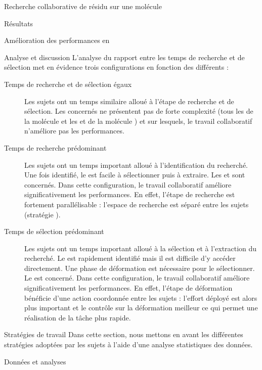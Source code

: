\documentclass[myfrancais,ngerman,english,french]{mythesis}
\begin{document}
\begin{mychapter}{Recherche collaborative de résidu sur une molécule}
\begin{mysection}{Résultats}
\begin{mysubsection}{Amélioration des performances en }
\begin{mysubsubsection}{Analyse et discussion}
					L'analyse du rapport entre les temps de recherche et de sélection met en évidence trois configurations en fonction des différents  :
					\begin{description}
						\item[Temps de recherche et de sélection égaux]
							Les sujets ont un temps similaire alloué à l'étape de recherche et de sélection.
							Les  concernés ne présentent pas de forte complexité (tous les  de la molécule \myTRPCAGE et les   et  de la molécule \myPrion) et sur lesquels, le travail collaboratif n'améliore pas les performances.
						\item[Temps de recherche prédominant]
							Les sujets ont un temps important alloué à l'identification du  recherché.
							Une fois identifié, le  est facile à sélectionner puis à extraire.
							Les   et  sont concernés.
							Dans cette configuration, le travail collaboratif améliore significativement les performances.
							En effet, l'étape de recherche est fortement parallélisable : l'espace de recherche est séparé entre les sujets (stratégie ).
						\item[Temps de sélection prédominant]
							Les sujets ont un temps important alloué à la sélection et à l'extraction du  recherché.
							Le  est rapidement identifié mais il est difficile d'y accéder directement.
							Une phase de déformation est nécessaire pour le sélectionner.
							Le   est concerné.
							Dans cette configuration, le travail collaboratif améliore significativement les performances.
							En effet, l'étape de déformation bénéficie d'une action coordonnée entre les sujets : l'effort déployé est alors plus important et le contrôle sur la déformation meilleur ce qui permet une réalisation de la tâche plus rapide.
					\end{description}
				\end{mysubsubsection}
			\end{mysubsection}
			\begin{mysubsection}{Stratégies de travail}
				Dans cette section, nous mettons en avant les différentes stratégies adoptées par les sujets à l'aide d'une analyse statistiques des données.
				\begin{mysubsubsection}{Données et analyses}

\end{mysubsubsection}
\end{mysubsection}
\end{mysection}
\end{mychapter}
\end{document}
